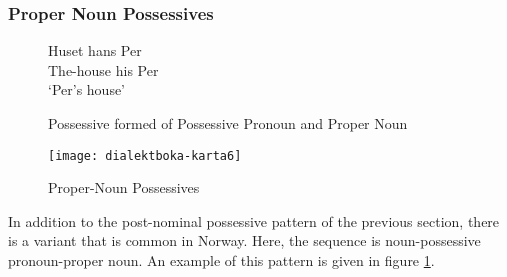 







\subsubsection{Proper Noun Possessives}

\begin{figure}
 \gll Huset hans Per \\
  The-house his Per \\
  \trans `Per's house'
  \caption{Possessive formed of Possessive Pronoun and Proper Noun}
  \label{proper-noun-post-possessive}
\end{figure}

\begin{figure}
  \texttt{[image: dialektboka-karta6]}
  \caption{Proper-Noun Possessives}
  \label{proper-noun-post-possessive-map}
\end{figure}

In addition to the post-nominal possessive pattern of the previous
section, there is a variant that is common in Norway. Here, the
sequence is noun-possessive pronoun-proper noun. An example
of this pattern is given in figure \ref{proper-noun-post-possessive}.

